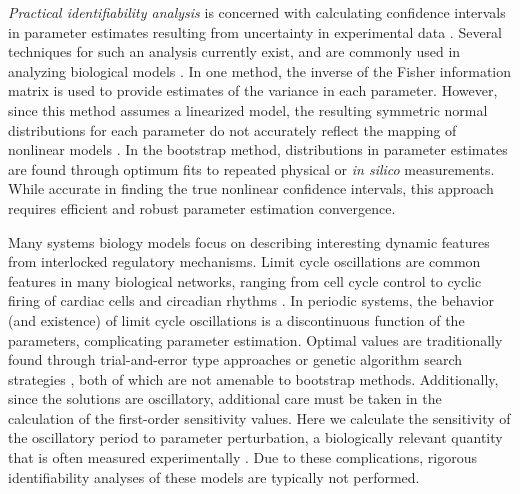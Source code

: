 {\itshape Practical identifiability analysis} is concerned with calculating
confidence intervals in parameter estimates resulting from uncertainty in
experimental data \cite{Raue2009}. Several techniques for such an analysis
currently exist, and are commonly used in analyzing biological models
\cite{Nihtila1977, Jimenez-Hornero2009, Holmberg1982}.  In one method, the
inverse of the Fisher information matrix is used to provide estimates of the
variance in each parameter. However, since this method assumes a linearized
model, the resulting symmetric normal distributions for each parameter do not
accurately reflect the mapping of nonlinear models \cite{Joshi2006}. In the
bootstrap method, distributions in parameter estimates are found through optimum
fits to repeated physical or {\itshape in silico} measurements. While accurate
in finding the true nonlinear confidence intervals, this approach requires
efficient and robust parameter estimation convergence.

Many systems biology models focus on describing interesting dynamic features
from interlocked regulatory mechanisms. Limit cycle oscillations are common
features in many biological networks, ranging from cell cycle control to cyclic
firing of cardiac cells and circadian rhythms \cite{Goldbeter1996}. In periodic
systems, the behavior (and existence) of limit cycle oscillations is a
discontinuous function of the parameters, complicating parameter estimation.
Optimal values are traditionally found through trial-and-error type approaches
\cite{Forger2003, Leloup2003} or genetic algorithm search strategies
\cite{Mirsky2009}, both of which are not amenable to bootstrap methods.
Additionally, since the solutions are oscillatory, additional care
must be taken in the calculation of the first-order sensitivity values. Here we
calculate the sensitivity of the oscillatory period to parameter perturbation, a
biologically relevant quantity that is often measured experimentally
\cite{Wilkins2009}. Due to these complications, rigorous identifiability
analyses of these models are typically not performed.

